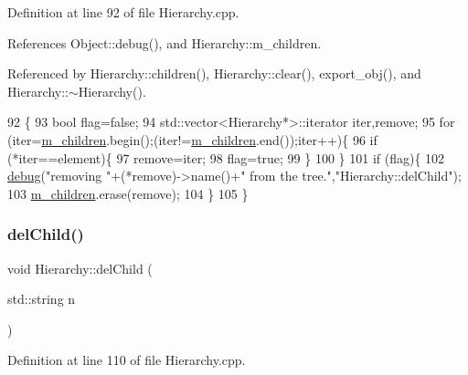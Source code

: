 Definition at line 92 of file Hierarchy.\+cpp.



References Object\+::debug(), and Hierarchy\+::m\+\_\+children.



Referenced by Hierarchy\+::children(), Hierarchy\+::clear(), export\+\_\+obj(), and Hierarchy\+::$\sim$\+Hierarchy().


\begin{DoxyCode}
92                                           \{
93   \textcolor{keywordtype}{bool} flag=\textcolor{keyword}{false};
94   std::vector<Hierarchy*>::iterator iter,\textcolor{keyword}{remove};
95   \textcolor{keywordflow}{for} (iter=\hyperlink{classHierarchy_a038816763941fd4a930504917f60483b}{m\_children}.begin();(iter!=\hyperlink{classHierarchy_a038816763941fd4a930504917f60483b}{m\_children}.end());iter++)\{
96     \textcolor{keywordflow}{if} (*iter==element)\{
97       \textcolor{keyword}{remove}=iter;
98       flag=\textcolor{keyword}{true};
99     \}
100   \}
101   \textcolor{keywordflow}{if} (flag)\{
102     \hyperlink{classObject_aac010553f022165573714b7014a15f0d}{debug}(\textcolor{stringliteral}{"removing "}+(*remove)->name()+\textcolor{stringliteral}{" from the tree."},\textcolor{stringliteral}{"Hierarchy::delChild"});
103     \hyperlink{classHierarchy_a038816763941fd4a930504917f60483b}{m\_children}.erase(\textcolor{keyword}{remove});
104   \}
105 \}
\end{DoxyCode}
\mbox{\label{classHierarchy_a1928ac7615fe0b5e55cd707f70dc6781}} 
\subsubsection{\texorpdfstring{del\+Child()}{delChild()}\hspace{0.1cm}{\footnotesize\ttfamily [2/2]}}
{\footnotesize\ttfamily void Hierarchy\+::del\+Child (\begin{DoxyParamCaption}\item[{std\+::string}]{n }\end{DoxyParamCaption})\hspace{0.3cm}{\ttfamily [inherited]}}



Definition at line 110 of file Hierarchy.\+cpp.




